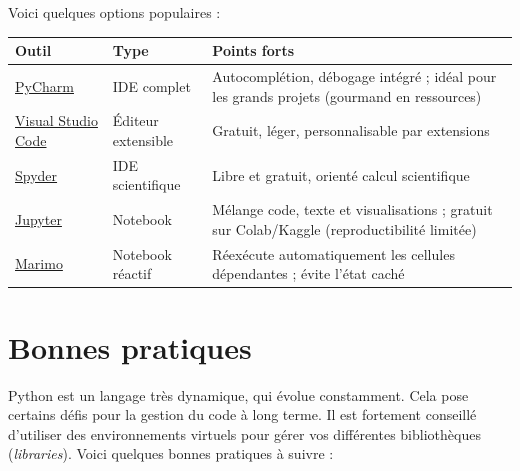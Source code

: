 \documentclass[
  french,
  11pt,
  letterpaper,
  open=any,
  twoside=false,
  french]{scrbook}
\newcounter{none} %
\begin{document}
Voici quelques options populaires :

{\def\LTcaptype{none} %
\begin{longtable}[]{@{}
  >{\raggedright\arraybackslash}p{}
  >{\raggedright\arraybackslash}p{}
  >{\raggedright\arraybackslash}p{}@{}}
\toprule\noalign{}
\begin{minipage}[b]{\linewidth}\raggedright
Outil
\end{minipage} & \begin{minipage}[b]{\linewidth}\raggedright
Type
\end{minipage} & \begin{minipage}[b]{\linewidth}\raggedright
Points forts
\end{minipage} \\
\midrule\noalign{}
\endhead
\bottomrule\noalign{}
\endlastfoot
\href{https://www.jetbrains.com/pycharm/}{PyCharm} & IDE complet &
Autocomplétion, débogage intégré ; idéal pour les grands projets
(gourmand en ressources) \\
\href{https://code.visualstudio.com/}{Visual Studio Code} & Éditeur
extensible & Gratuit, léger, personnalisable par extensions \\
\href{https://www.spyder-ide.org/}{Spyder} & IDE scientifique & Libre et
gratuit, orienté calcul scientifique \\
\href{https://jupyter.org/}{Jupyter} & Notebook & Mélange code, texte et
visualisations ; gratuit sur Colab/Kaggle (reproductibilité limitée) \\
\href{https://marimo.io/}{Marimo} & Notebook réactif & Réexécute
automatiquement les cellules dépendantes ; évite l'état caché \\
\end{longtable}
}

\section{Bonnes pratiques}\label{bonnes-pratiques}

Python est un langage très dynamique, qui évolue constamment. Cela pose
certains défis pour la gestion du code à long terme. Il est fortement
conseillé d'utiliser des environnements virtuels pour gérer vos
différentes bibliothèques (\emph{libraries}). Voici quelques bonnes
pratiques à suivre :
\end{document}
